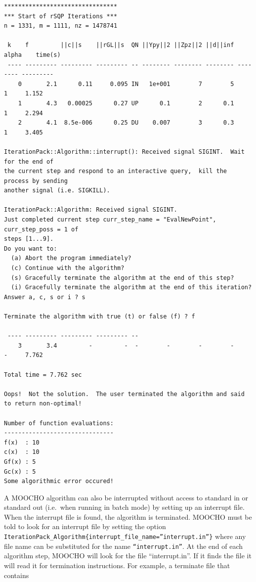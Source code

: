 \documentclass[pdf,ps2pdf,11pt]{SANDreport}
\begin{document}
{\small\begin{verbatim}
********************************
*** Start of rSQP Iterations ***
n = 1331, m = 1111, nz = 1478741

 k    f         ||c||s    ||rGL||s  QN ||Ypy||2 ||Zpz||2 ||d||inf alpha    time(s)
 ---- --------- --------- --------- -- -------- -------- -------- -------- ---------
    0       2.1      0.11     0.095 IN   1e+001        7        5        1     1.152
    1       4.3   0.00025      0.27 UP      0.1        2      0.1        1     2.294
    2       4.1  8.5e-006      0.25 DU    0.007        3      0.3        1     3.405

IterationPack::Algorithm::interrupt(): Received signal SIGINT.  Wait for the end of
the current step and respond to an interactive query,  kill the process by sending
another signal (i.e. SIGKILL).

IterationPack::Algorithm: Received signal SIGINT.
Just completed current step curr_step_name = "EvalNewPoint",  curr_step_poss = 1 of
steps [1...9].
Do you want to:
  (a) Abort the program immediately?
  (c) Continue with the algorithm?
  (s) Gracefully terminate the algorithm at the end of this step?
  (i) Gracefully terminate the algorithm at the end of this iteration?
Answer a, c, s or i ? s

Terminate the algorithm with true (t) or false (f) ? f

 ---- --------- --------- --------- --
    3       3.4         -         -  -        -        -        -        -     7.762

Total time = 7.762 sec

Oops!  Not the solution.  The user terminated the algorithm and said to return non-optimal!

Number of function evaluations:
-------------------------------
f(x)  : 10
c(x)  : 10
Gf(x) : 5
Gc(x) : 5
Some algorithmic error occured!
\end{verbatim}}
%
A MOOCHO algorithm can also be interrupted without access to standard in or
standard out (i.e.\ when running in batch mode) by setting up an interrupt
file.  When the interrupt file is found, the algorithm is terminated.  MOOCHO
must be told to look for an interrupt file by setting the option
{}\texttt{IterationPack\_Algorithm\{interrupt\_file\_name=''interrupt.in''\}}
where any file name can be substituted for the name
{}\texttt{``interrupt.in''}.  At the end of each algorithm step, MOOCHO will
look for the file ``interrupt.in''.  If it finds the file it will read it for
termination instructions.  For example, a terminate file that contains
\end{document}
